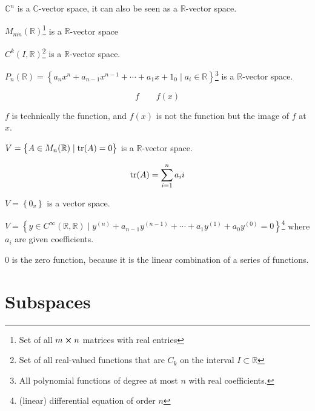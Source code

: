 \begin{example}
	$\mathbb{C}^n$ is a $\mathbb{C}$-vector space, it can also be seen as a $\mathbb{R}$-vector space.
\end{example}

\begin{example}
	$M_{mn}(\mathbb{R})$\footnote{Set of all $m\cross n$ matrices with real entries} is a $\mathbb{R}$-vector space
\end{example}

\begin{example}
	$C^k (I, \mathbb{R})$\footnote{Set of all real-valued functions that are $C_k$ on the interval $I \subset \mathbb{R}$} is a $\mathbb{R}$-vector space.
\end{example}

\begin{example}
	$P_n (\mathbb{R}) = \left\{a_n x^n + a_{n-1} x^{n-1} + \cdots + a_1 x + 1_0 \mid a_i \in \mathbb{R}\right\}$\footnote{All polynomial functions of degree at most $n$ with real coefficients.} is a $\mathbb{R}$-vector space.
\end{example}

\begin{remark}
	\[f \qquad f(x)\]

	$f$ is technically the function, and $f(x)$ is not the function but the image of $f$ at $x$.
\end{remark}

\begin{example}
	$V = \left\{A \in M_n(\mathbb{R}) \mid \tr(A) = 0\right\}$ is a $\mathbb{R}$-vector space.

	\[\tr(A) = \sum_{i=1}^{n} a_ii\]
\end{example}

\begin{example}
	$V = \left\{0_v\right\}$ is a vector space.
\end{example}

\begin{example}
	$V = \left\{y \in C^\infty (\mathbb{R}, \mathbb{R}) \mid y^{(n)} + a_{n-1}y^{(n-1)} + \cdots + a_1 y^{(1)} + a_0 y^{(0)} = 0\right\}$\footnote{(linear) differential equation of order $n$} where $a_i$ are given coefficients.

	0 is the zero function, because it is the linear combination of a series of functions.
\end{example}

\section{Subspaces}

